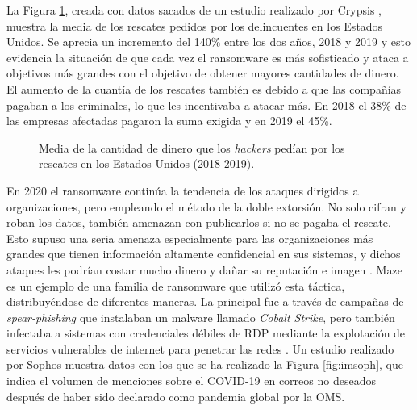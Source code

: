 La Figura \ref{fig:imavg}, creada con datos sacados de un estudio realizado por Crypsis \cite{70}, muestra la media de los rescates pedidos por los delincuentes en los Estados Unidos. Se aprecia un incremento del 140\% entre los dos años, 2018 y 2019 y esto evidencia la situación de que cada vez el ransomware es más sofisticado y ataca a objetivos más grandes con el objetivo de obtener mayores cantidades de dinero. El aumento de la cuantía de los rescates también es debido a que las compañías pagaban a los criminales, lo que les incentivaba a atacar más. En 2018 el 38\% de las empresas afectadas pagaron la suma exigida y en 2019 el 45\%.
\begin{figure}[h!]
\begin{center}
{}
\end{center}
\caption{Media de la cantidad de dinero que los \textit{hackers} pedían por los rescates en los Estados Unidos (2018-2019).}
\label{fig:imavg}
\end{figure}

En 2020 el ransomware continúa la tendencia de los ataques dirigidos a organizaciones, pero empleando el método de la doble extorsión. No solo cifran y roban los datos, también amenazan con publicarlos si no se pagaba el rescate. Esto supuso una seria amenaza especialmente para las organizaciones más grandes que tienen información altamente confidencial en sus sistemas, y dichos ataques les podrían costar mucho dinero y dañar su reputación e imagen \cite{71}. Maze es un ejemplo de una familia de ransomware que utilizó esta táctica, distribuyéndose de diferentes maneras. La principal fue a través de campañas de \textit{spear-phishing} que instalaban un malware llamado \textit{Cobalt Strike}, pero también infectaba a sistemas con credenciales débiles de \gls{RDP} mediante la explotación de servicios vulnerables de internet para penetrar las redes \cite{25}.
Un estudio realizado por Sophos \cite{38} muestra datos con los que se ha realizado la Figura \ref{fig:imsoph}, que indica el volumen de menciones sobre el \gls{COVID-19} en correos no deseados después de haber sido declarado como pandemia global por la \gls{OMS}.

